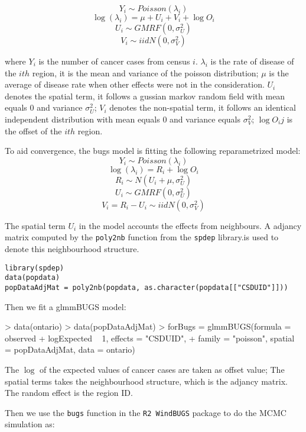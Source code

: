 \documentclass[a4paper]{report}
\begin{document}
\begin{article}
\[Y_{i} \sim  Poisson(\lambda_i)\]
\[\log(\lambda_{i}) = \mu + U_i + V_i+ \log{O_i}\]
\[U_i \sim GMRF(0, \sigma_U^2)\]
\[V_i \sim iid N(0, \sigma_V^2)\] 

where $Y_{i}$ is the number of cancer cases from census $i$. 
$\lambda_{i}$ is the rate of disease of the $ith$ region, it is the mean and variance of the poisson distribution; 
$\mu$ is the average of disease rate when other effects were not in the consideration.
$U_i$ denotes the spatial term, it follows a gussian markov random field with mean equals $0$ and variance $\sigma_U^2$; 
$V_i$ denotes the non-spatial term, it follows an identical independent distribution with mean equals $0$ and variance equals $\sigma_V^2$; 
$\log{O_ij}$ is the offset of the $ith$ region.


To aid convergence, the bugs model is fitting the following reparametrized model:
\[Y_{i} \sim  Poisson(\lambda_i)\]
\[\log(\lambda_i) = R_i+ \log{O_i}\]
\[R_i \sim N(U_i + \mu, \sigma_U^2)\]
\[U_i \sim GMRF(0, \sigma_U^2)\]
\[V_{i} = R_i - U_i \sim iid N(0, \sigma_V^2)\] 

The spatial term $U_i$ in the model accounts the effects from neighbours. A adjancy matrix computed by the \verb!poly2nb! function from the \verb!spdep! library.is used to denote this neighbourhood structure.

\begin{verbatim}
library(spdep)
data(popdata)
popDataAdjMat = poly2nb(popdata, as.character(popdata[["CSDUID"]]))
\end{verbatim}

Then we fit a glmmBUGS model: 
\begin{Schunk}
\begin{Sinput}
> data(ontario)
> data(popDataAdjMat)
> forBugs = glmmBUGS(formula = observed + logExpected ~ 1, effects = "CSDUID", 
+     family = "poisson", spatial = popDataAdjMat, data = ontario)
\end{Sinput}
\end{Schunk}

The $\log$ of the expected values of cancer cases are taken as offset value; The spatial terms takes the neighbourhood structure, which is the adjancy matrix. The random effect is the region ID.

Then we use the \verb!bugs! function in the \verb!R2 WindBUGS! package to do the MCMC simulation as: 
\begin{Schunk}
\end{Schunk}


\end{article}
\end{document}
